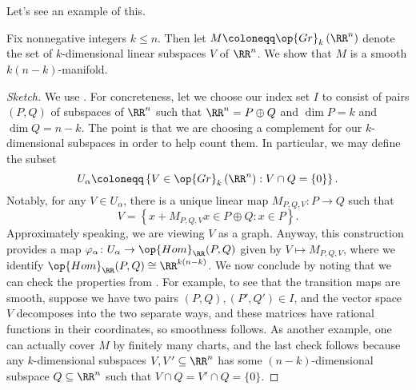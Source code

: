 \documentclass[../notes.tex]{subfiles}
\begin{document}
Let's see an example of this.
\begin{exe}
	Fix nonnegative integers $k\le n$. Then let $M\coloneqq\op{Gr}_k\left(\RR^n\right)$ denote the set of $k$-dimensional linear subspaces $V$ of $\RR^n$. We show that $M$ is a smooth $k(n-k)$-manifold.
\end{exe}
\begin{proof}[Sketch]
	We use . For concreteness, let we choose our index set $I$ to consist of pairs $(P,Q)$ of subspaces of $\RR^n$ such that $\RR^n=P\oplus Q$ and $\dim P=k$ and $\dim Q=n-k$. The point is that we are choosing a complement for our $k$-dimensional subspaces in order to help count them. In particular, we may define the subset
	\[U_\alpha\coloneqq\left\{V\in\op{Gr}_k\left(\RR^n\right):V\cap Q=\{0\}\right\}.\]
	Notably, for any $V\in U_\alpha$, there is a unique linear map $M_{P,Q,V}\colon P\to Q$ such that
	\[V=\left\{x+M_{P,Q,V}x\in P\oplus Q:x\in P\right\}.\]
	Approximately speaking, we are viewing $V$ as a graph. Anyway, this construction provides a map $\varphi_\alpha\colon U_\alpha\to\op{Hom}_\RR(P,Q)$ given by $V\mapsto M_{P,Q,V}$, where we identify $\op{Hom}_\RR(P,Q)\cong\RR^{k(n-k)}$. We now conclude by noting that we can check the properties from . For example, to see that the transition maps are smooth, suppose we have two pairs $(P,Q),(P',Q')\in I$, and the vector space $V$ decomposes into the two separate ways, and these matrices have rational functions in their coordinates, so smoothness follows. As another example, one can actually cover $M$ by finitely many charts, and the last check follows because any $k$-dimensional subspaces $V,V'\subseteq\RR^n$ has some $(n-k)$-dimensional subspace $Q\subseteq\RR^n$ such that $V\cap Q=V'\cap Q=\{0\}$.
\end{proof}
\end{document}
